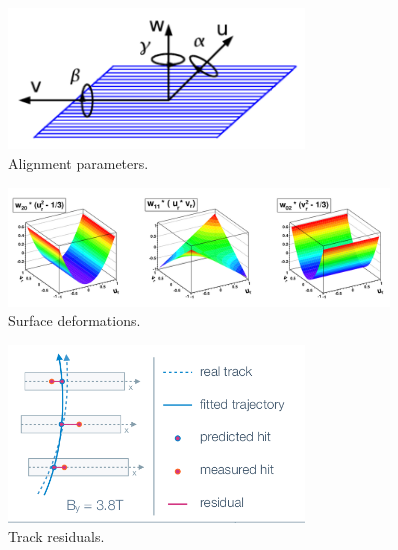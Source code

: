 \begin{figure}[htb]
    \begin{center}
        \includegraphics[width=0.70\textwidth]{../figs/Alignment/alignment_strip_coords.png}
    \end{center}
    \caption{Alignment parameters.}
    \label{fig:alignmentParameters}
\end{figure}

\begin{figure}[htb]
    \begin{center}
        \includegraphics[width=0.90\textwidth]{../figs/Alignment/alignment_surface_deformations.png}
    \end{center}
    \caption{Surface deformations.}
    \label{fig:surfaceDeformations}
\end{figure}

\begin{figure}[htb]
    \begin{center}
        \includegraphics[width=0.70\textwidth]{../figs/Alignment/track.png}
    \end{center}
    \caption{Track residuals.}
    \label{fig:trackAndResiduals}
\end{figure}

